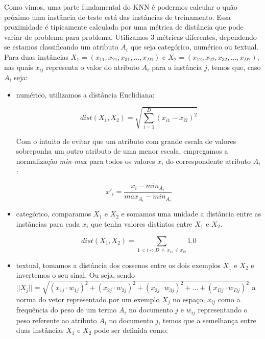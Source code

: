 Como vimos, uma parte fundamental do \textsc{KNN} é podermos calcular o quão próximo uma instância de teste está das instâncias de treinamento. 
Essa proximidade é tipicamente calculada por uma métrica de distância que pode variar de problema para problema. Utilizamos 3 métricas diferentes, dependendo se estamos classificando um atributo $A_i$ que seja categórico, numérico ou textual. Para duas instâncias $X_1 =  (x_{11}, x_{21}, x_{31}, ..., x_{D1})$ e $X_2 = (x_{12}, x_{22}, x_{32}, ..., x_{D2})$, nas quais $x_{ij}$ representa o valor do atributo $A_i$ para a instância $j$, temos que, caso $A_i$ seja:

\begin{itemize}

\item numérico, utilizamos a distância Euclidiana:

\begin{equation}\label{eqn::distancia_euclidiana}
    dist(X_1, X_2) =  \sqrt{\sum_{i=1}^D (x_{i1}-x_{i2})^2}
\end{equation}

    Com o intuito de evitar que um atributo com grande escala de valores sobreponha um outro atributo de uma menor escala, empregamos a normalização \textit{min-max} para todos os valores $x_i$ do correspondente atributo $A_i$: 

\begin{equation}\label{eqn::distancia_euclidiana}
    x'_{i} =  \frac{x_{i} - min_{A_i}}{ max_{A_i} - min_{A_i} }
\end{equation}

\item categórico, comparamos $X_1$ e $X_2$ e somamos uma unidade a distância entre as instâncias para cada $x_i$ que tenha valores distintos entre $X_1$ e $X_2$.

\begin{equation}\label{eqn::distancia_cat}
   dist(X_1, X_2) = \sum_{1 < i < D \ \wedge \ x_{i1} \neq x_{i2}} 1.0
\end{equation}

\item textual, tomamos a distância dos cossenos entre os dois exemplos $X_1$ e $X_2$ e invertemos o seu sinal. Ou seja, sendo $||X_j|| = \sqrt{ (x_{1j} \cdot w_{1j})^2 + (x_{2j} \cdot w_{2j})^2 + (x_{3j} \cdot w_{3j})^2 + ... + (x_{Dj} \cdot w_{Dj})^2}$ a norma do vetor representado por um exemplo $X_j$ no espaço, $x_{ij}$ como a frequência do peso de um termo $A_i$ no documento $j$ e $w_{ij}$ representando o peso referente ao atributo $A_i$ no documento $j$, temos que a semelhança entre duas instâncias $X_1$ e $X_2$ pode ser definida como:


\end{itemize}
